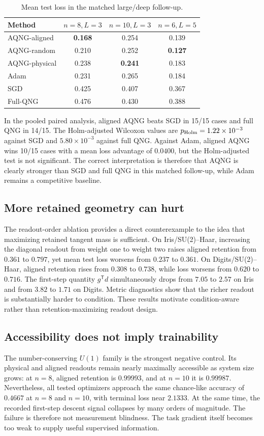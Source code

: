 \begin{table}[t]
\centering
\caption{Mean test loss in the matched large/deep follow-up.}
\label{tab:large_deep}
\begin{tabular}{lccc}
\toprule
Method & $n=8,L=3$ & $n=10,L=3$ & $n=6,L=5$ \\
\midrule
AQNG-aligned  & \textbf{0.168} & 0.254 & 0.139 \\
AQNG-random   & 0.210 & 0.252 & \textbf{0.127} \\
AQNG-physical & 0.238 & \textbf{0.241} & 0.183 \\
Adam          & 0.231 & 0.265 & 0.184 \\
SGD           & 0.425 & 0.407 & 0.367 \\
Full-QNG      & 0.476 & 0.430 & 0.388 \\
\bottomrule
\end{tabular}
\end{table}

In the pooled paired analysis, aligned AQNG beats SGD in 15/15 cases and full QNG in 14/15. The Holm-adjusted Wilcoxon values are $p_{\rm Holm}=1.22\times10^{-3}$ against SGD and $5.80\times10^{-3}$ against full QNG. Against Adam, aligned AQNG wins 10/15 cases with a mean loss advantage of $0.0400$, but the Holm-adjusted test is not significant. The correct interpretation is therefore that AQNG is clearly stronger than SGD and full QNG in this matched follow-up, while Adam remains a competitive baseline.

\subsection{More retained geometry can hurt}
The readout-order ablation provides a direct counterexample to the idea that maximizing retained tangent mass is sufficient. On Iris/SU(2)--Haar, increasing the diagonal readout from weight one to weight two raises aligned retention from $0.361$ to $0.797$, yet mean test loss worsens from $0.237$ to $0.361$. On Digits/SU(2)--Haar, aligned retention rises from $0.308$ to $0.738$, while loss worsens from $0.620$ to $0.716$. The first-step quantity $g^{\mathsf T}d$ simultaneously drops from $7.05$ to $2.57$ on Iris and from $3.82$ to $1.71$ on Digits. Metric diagnostics show that the richer readout is substantially harder to condition. These results motivate condition-aware rather than retention-maximizing readout design.

\subsection{Accessibility does not imply trainability}
The number-conserving $U(1)$ family is the strongest negative control. Its physical and aligned readouts remain nearly maximally accessible as system size grows: at $n=8$, aligned retention is $0.99993$, and at $n=10$ it is $0.99987$. Nevertheless, all tested optimizers approach the same chance-like accuracy of $0.4667$ at $n=8$ and $n=10$, with terminal loss near $2.1333$. At the same time, the recorded first-step descent signal collapses by many orders of magnitude. The failure is therefore not measurement blindness. The task gradient itself becomes too weak to supply useful supervised information.

